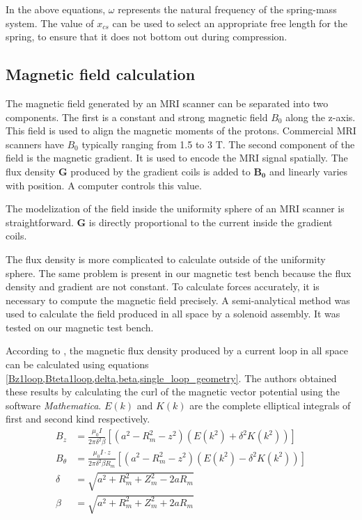 \documentclass[letterpaper, 10 pt, journal, twoside]{ieeetran}
\begin{document}
In the above equations, $\omega$ represents the natural frequency of the spring-mass system. The value of $x_{cs}$ can be used to select an appropriate free length for the spring, to ensure that it does not bottom out during compression. 
\subsection{Magnetic field calculation}
\label{magfield}
The magnetic field generated by an MRI scanner can be separated into two components. The first is a constant and strong magnetic field $B_0$ along the z-axis. This field is used to align the magnetic moments of the protons. Commercial MRI scanners have $B_0$ typically ranging from 1.5 to 3 T. The second component of the field is the magnetic gradient. It is used to encode the MRI signal spatially. The flux density $\mathbf{G}$ produced by the gradient coils is added to $\mathbf{B_0}$ and linearly varies with position. A computer controls this value.\par
The modelization of the field inside the uniformity sphere of an MRI scanner is straightforward. $\mathbf{G}$ is directly proportional to the current inside the gradient coils.\par

The flux density is more complicated to calculate outside of the uniformity sphere. The same problem is present in our magnetic test bench because the flux density and gradient are not constant. To calculate forces accurately, it is necessary to compute the magnetic field precisely. A semi-analytical method was used to calculate the field produced in all space by a solenoid assembly. It was tested on our magnetic test bench.\par
According to \cite{simpson2001simple}, the magnetic flux density produced by a current loop in all space can be calculated using equations \cref{Bz1loop,Bteta1loop,delta,beta,single_loop_geometry}. The authors obtained these results by calculating the curl of the magnetic vector potential using the software \textit{Mathematica}.  $E(k)$ and $K(k)$ are the complete elliptical integrals of first and second kind respectively.
\begin{align}
B_z &=\frac{\mu _0I}{2\pi\delta ^{2}\beta  }\left [ \left ( a^2-R_m ^2-z^2 \right )(E(k^2)+\delta ^2K(k^2)) \right ] 
\label{Bz1loop}\\
B_\theta &=\frac{\mu _0 I \cdot z}{2\pi\delta ^{2}\beta R_m   }\left [ \left ( a^2-R_m ^2-z^2 \right )(E(k^2)-\delta ^2K(k^2)) \right ]
\label{Bteta1loop}\\
\delta &=\sqrt{a^2+R_m^2+Z_m^2-2aR_m}
\label{delta}\\
\beta &=\sqrt{a^2+R_m^2+Z_m^2+2aR_m}
\label{beta}
\end{align}
\end{document}
